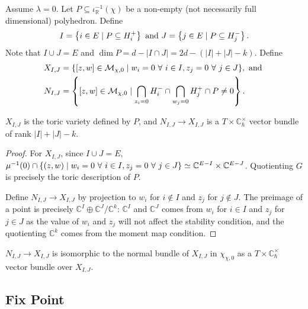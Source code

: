 \documentclass[b5paper]{article}
\newcommand{\MM}{\mathcal{M}}
\newcommand{\Chbar}{\mathbb{C}^\times _\hbar}
\begin{document}
Assume $\lambda=0$.
Let $P\subseteq \iota^{-1}_\mathbb{R}(\chi)$ be a non-empty (not necessarily full dimensional) polyhedron. Define
\[
  I=\left\{i\in E\mid P\subseteq H_i^+\right\}
  \textnormal{ and }
  J=\left\{j\in E\mid P\subseteq H_j^-\right\}.
\]
Note that $I\cup J=E$ and $\dim P=d-|I\cap J|=2d-(|I|+|J|-k)$.
Define 
\begin{alignat*}{1}
    X_{I,J}&=\{[z,w]\in \MM_{\chi,0}\mid w_i=0\ \forall\ i\in I, z_j=0\ \forall\ j\in J\},\textnormal{ and }\\
    N_{I,J}&=\CB{[z,w]\in \MM_{\chi,0}\mid \bigcap_{z_i=0}H_i^-\cap \bigcap_{w_j=0}H_j^+\cap P\neq 0}.
\end{alignat*}
\begin{proposition}[pps:]{}
  $X_{I,J}$ is the toric variety defined by $P$, and $N_{I,J}\rightarrow X_{I,J}$ is a $T\times \Chbar$ vector bundle of rank $|I|+|J|-k$.
  \begin{proof}
      For $X_{I,J}$, since $I\cup J=E$, $\mu^{-1}(0)\cap \CB{(z,w)\mid w_i=0\ \forall\ i\in I, z_j=0\ \forall\ j\in J}\simeq \mathbb{C}^{E-I}\times \mathbb{C}^{E-J}$. Quotienting $G$ is precisely the toric description of $P$.

      Define $N_{I,J}\rightarrow X_{I,J}$ by projection to $w_i$ for $i\notin I$ and $z_j$ for $j\notin J$. The preimage of a point is precisely $\mathbb{C}^{I}\oplus\mathbb{C}^J/\mathbb{C}^k$: $\mathbb{C}^I$ and $\mathbb{C}^J$ comes from $w_i$ for $i\in I$ and $z_j$ for $j\in J$ as the value of $w_i$ and $z_j$ will not affect the stability condition, and the quotienting $\mathbb{C}^k$ comes from the moment map condition.
  \end{proof}
\end{proposition}

\begin{theorem}[thm:]{}
  $N_{I,J}\rightarrow X_{I,J}$ is isomorphic to the normal bundle of $X_{I,J}$ in $\chi_{\chi,0}$ as a $T\times \Chbar$ vector bundle over $X_{I,J}$.
\end{theorem}

\subsection{Fix Point}
\end{document}
